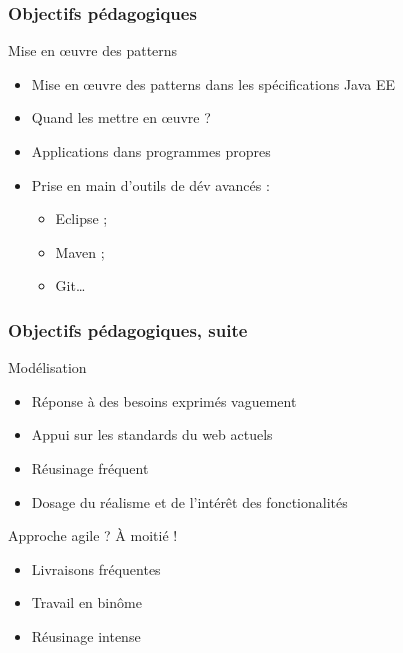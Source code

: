 \documentclass[english, french]{beamer}
\begin{document}
\begin{frame}
	\frametitle{Objectifs pédagogiques}
	\begin{block}{Mise en œuvre des patterns}
		\begin{itemize}
		\item Mise en œuvre des patterns dans les spécifications Java EE
		\item Quand les mettre en œuvre ?
		\item Applications dans programmes propres
		\end{itemize}
	\end{block}
	\begin{itemize}
		\item Prise en main d’outils de dév avancés : 
		\begin{itemize}
			\item Eclipse ;
			\item Maven ;
			\item Git…
		\end{itemize}
	\end{itemize}
\end{frame}

\begin{frame}
	\frametitle{Objectifs pédagogiques, suite}
	\begin{block}{Modélisation}
		\begin{itemize}
		\item Réponse à des besoins exprimés vaguement
		\item Appui sur les standards du web actuels
		\item Réusinage fréquent
		\item Dosage du réalisme et de l’intérêt des fonctionalités
		\end{itemize}
	\end{block}
	Approche agile ? À moitié !
	\begin{itemize}
		\item Livraisons fréquentes
		\item Travail en binôme
		\item Réusinage intense
	\end{itemize}
\end{frame}
\end{document}
